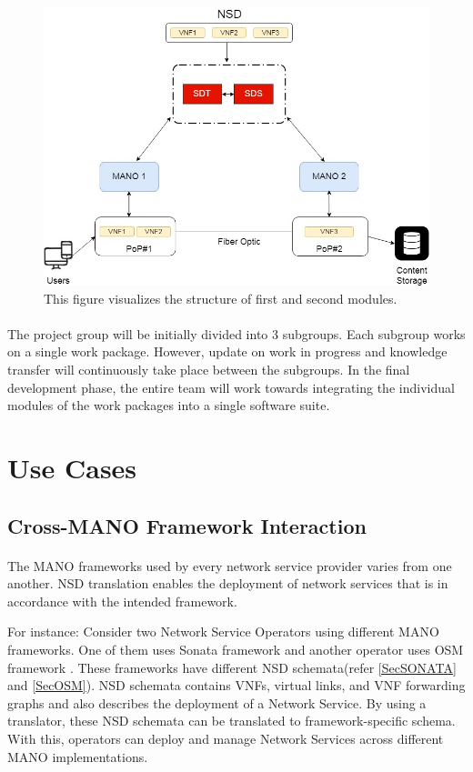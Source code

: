 \begin{figure}[h]
	\centering
	\includegraphics[width=0.7\linewidth]{figures/Structure1}
	\caption{This figure visualizes the structure of first and second modules. }
	\label{fig:structure1}
\end{figure}



\paragraph{}
The project group will be initially divided into 3 subgroups. Each subgroup works on a single work package. However, update on work in progress and knowledge transfer will continuously take place between the subgroups. In the final development phase, the entire team will work towards integrating the individual modules of the work packages into a single software suite.


\section{Use Cases}

\subsection{Cross-MANO Framework Interaction}
\paragraph{}

The MANO frameworks used by every network service provider varies from one another. NSD translation enables the deployment of network services that is in accordance with the intended framework.

For instance: Consider two Network Service Operators using different MANO frameworks. One of them uses Sonata framework \cite{draxler2017sonata} and another operator uses OSM framework \cite{ersue2013etsi}. These frameworks have different NSD schemata(refer \ref{SecSONATA} and \ref{SecOSM}). NSD schemata contains VNFs, virtual links, and VNF forwarding graphs and also describes the deployment of a Network Service. By using a translator, these NSD schemata can be translated to framework-specific schema. With this, operators can deploy and manage Network Services across different MANO implementations.


